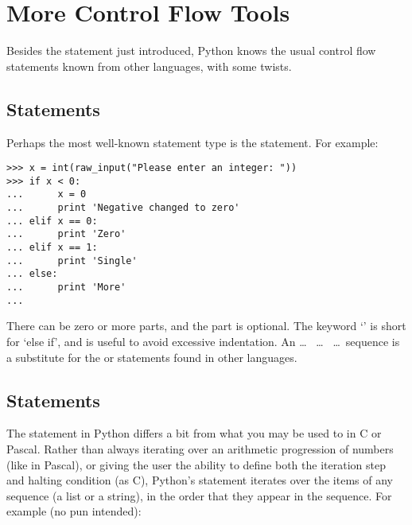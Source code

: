 \documentclass{manual}
\begin{document}
\chapter{More Control Flow Tools \label{moreControl}}

Besides the  statement just introduced, Python knows
the usual control flow statements known from other languages, with
some twists.

\section{ Statements \label{if}}

Perhaps the most well-known statement type is the
 statement.  For example:

\begin{verbatim}
>>> x = int(raw_input("Please enter an integer: "))
>>> if x < 0:
...      x = 0
...      print 'Negative changed to zero'
... elif x == 0:
...      print 'Zero'
... elif x == 1:
...      print 'Single'
... else:
...      print 'More'
... 
\end{verbatim}

There can be zero or more  parts, and the
 part is optional.  The keyword `' is
short for `else if', and is useful to avoid excessive indentation.  An 
 \ldots\  \ldots\  \ldots\ sequence
is a substitute for the  or
 statements found in other languages.


\section{ Statements \label{for}}

The  statement in Python differs a bit from
what you may be used to in C or Pascal.  Rather than always
iterating over an arithmetic progression of numbers (like in Pascal),
or giving the user the ability to define both the iteration step and
halting condition (as C), Python's
 statement iterates over the items of any
sequence (a list or a string), in the order that they appear in
the sequence.  For example (no pun intended):
\end{document}
